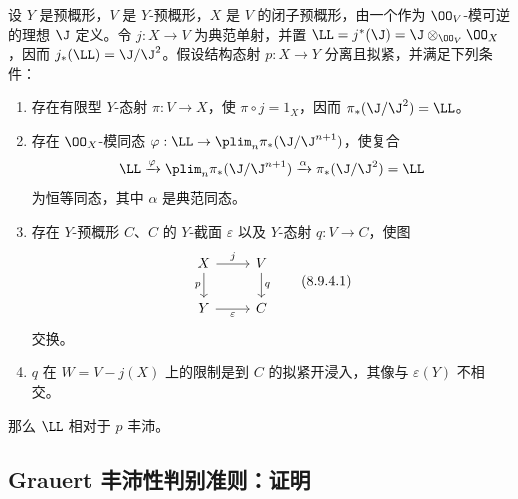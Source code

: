  设 $Y$ 是预概形，$V$ 是 $Y$-预概形，$X$ 是 $V$ 的闭子预概形，由一个作为 $\OO_V$-模可逆的理想 $\J$ 定义。令 $j:X\to V$ 为典范单射，并置 $\LL=j^*(\J)=\J\otimes_{\OO_V}\OO_X$，因而 $j_*(\LL)=\J/\J^2$。假设结构态射 $p:X\to Y$ 分离且拟紧，并满足下列条件：
\begin{enumerate}[label=(\roman*)]
\item 存在有限型 $Y$-态射 $\pi:V\to X$，使 $\pi\circ j=1_X$，因而 $\pi_*(\J/\J^2)=\LL$。
\item 存在 $\OO_X$-模同态 $\varphi:\LL\to\plim_n\pi_*(\J/\J^{n+1})$，使复合
\[\LL\xrightarrow{\varphi}\plim_n\pi_*(\J/\J^{n+1})\xrightarrow{\alpha}\pi_*(\J/\J^2)=\LL\]
为恒等同态，其中 $\alpha$ 是典范同态。
\item 存在 $Y$-预概形 $C$、$C$ 的 $Y$-截面 $\varepsilon$ 以及 $Y$-态射 $q:V\to C$，使图
\begin{equation}\begin{tikzcd}X\arrow[r,"j"]\arrow[d,"p"']&V\arrow[d,"q"]\\Y\arrow[r,"\varepsilon"']&C\end{tikzcd}\tag{8.9.4.1}\end{equation}
交换。
\item $q$ 在 $W=V-j(X)$ 上的限制是到 $C$ 的拟紧开浸入，其像与 $\varepsilon(Y)$ 不相交。
\end{enumerate}
那么 $\LL$ 相对于 $p$ 丰沛。

\subsection{Grauert 丰沛性判别准则：证明}

